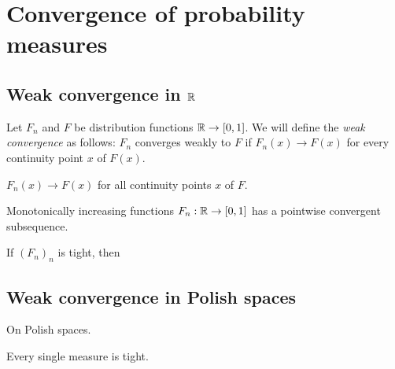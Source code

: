 \documentclass{../note}
\begin{document}
\chapter{Convergence of probability measures}


\section{Weak convergence in $\mathbb{R}$}
\begin{prb}
Let $F_n$ and $F$ be distribution functions $\mathbb{R}\to[0,1]$.
We will define the \emph{weak convergence} as follows: $F_n$ converges weakly to $F$ if $F_n(x)\to F(x)$ for every continuity point $x$ of $F(x)$.
\begin{parts}
\item $F_n(x)\to F(x)$ for all continuity points $x$ of $F$.
\end{parts}
\end{prb}

\begin{prb}
\end{prb}

\begin{prb}
\end{prb}

\begin{prb}
\end{prb}

\begin{prb}
\begin{parts}
\item Monotonically increasing functions $F_n:\mathbb{R}\to[0,1]$ has a pointwise convergent subsequence.
\item If $(F_n)_n$ is tight, then
\end{parts}
\end{prb}




\section{Weak convergence in Polish spaces}

\begin{prb}
On Polish spaces.
\begin{parts}
\item Every single measure is tight.
\end{parts}
\end{prb}
\end{document}
